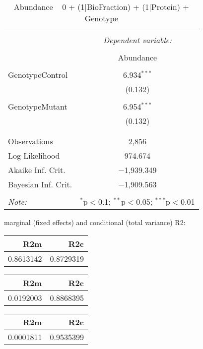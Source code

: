 \documentclass[11pt]{report}
\begin{document}
\begin{table}[!htbp] \centering 
  \caption{Abundance ~ 0 + (1|BioFraction) + (1|Protein) + Genotype} 
  \label{} 
\begin{tabular}{@{\extracolsep{5pt}}lc} 
\\[-1.8ex]\hline 
\hline \\[-1.8ex] 
 & \multicolumn{1}{c}{\textit{Dependent variable:}} \\ 
\cline{2-2} 
\\[-1.8ex] & Abundance \\ 
\hline \\[-1.8ex] 
 GenotypeControl & 6.934$^{***}$ \\ 
  & (0.132) \\ 
  & \\ 
 GenotypeMutant & 6.954$^{***}$ \\ 
  & (0.132) \\ 
  & \\ 
\hline \\[-1.8ex] 
Observations & 2,856 \\ 
Log Likelihood & 974.674 \\ 
Akaike Inf. Crit. & $-$1,939.349 \\ 
Bayesian Inf. Crit. & $-$1,909.563 \\ 
\hline 
\hline \\[-1.8ex] 
\textit{Note:}  & \multicolumn{1}{r}{$^{*}$p$<$0.1; $^{**}$p$<$0.05; $^{***}$p$<$0.01} \\ 
\end{tabular} 
\end{table} 
marginal (fixed effects) and conditional (total variance) R2:

\begin{tabular}{r|r}
\hline
R2m & R2c\\
\hline
0.8613142 & 0.8729319\\
\hline
\end{tabular}

\begin{tabular}{r|r}
\hline
R2m & R2c\\
\hline
0.0192003 & 0.8868395\\
\hline
\end{tabular}

\begin{tabular}{r|r}
\hline
R2m & R2c\\
\hline
0.0001811 & 0.9535399\\
\hline
\end{tabular}
\end{document}
